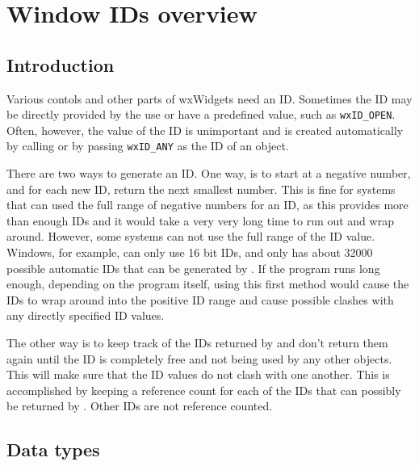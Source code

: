 \section{Window IDs overview}\label{windowidsoverview}



\subsection{Introduction}\label{windowidsoverviewintro}

Various contols and other parts of wxWidgets need an ID.  Sometimes the
ID may be directly provided by the use or have a predefined value, such as
\texttt{wxID\_OPEN}. Often, however, the value of the ID is unimportant and is
created automatically by calling  
or by passing \texttt{wxID\_ANY} as the ID of an object.

There are two ways to generate an ID.  One way, is to start at a negative number,
and for each new ID, return the next smallest number.  This is fine for systems
that can used the full range of negative numbers for an ID, as this provides
more than enough IDs and it would take a very very long time to run out and
wrap around.  However, some systems can not use the full range of the ID value.
Windows, for example, can only use 16 bit IDs, and only has about 32000 possible
automatic IDs that can be generated by .
If the program runs long enough, depending on the program itself, using this first
method would cause the IDs to wrap around into the positive ID range and cause possible
clashes with any directly specified ID values.

The other way is to keep track of the IDs returned by 
and don't return them again until the ID is completely free and not being used by
any other objects.  This will make sure that the ID values do not clash with one
another.  This is accomplished by keeping a reference count for each of the IDs
that can possibly be returned by .
Other IDs are not reference counted.

\subsection{Data types}\label{windowidsoverviewtypes}

